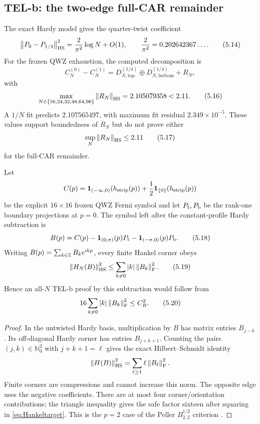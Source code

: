 \subsection{TEL-b: the two-edge full-CAR remainder}

The exact Hardy model gives the quarter-twist coefficient
\[
 \left\lVert P_0-P_{1/4}\right\rVert_{\mathrm{HS}}^2
 =\frac{2}{\pi^2}\log N+O(1),
\qquad \frac2{\pi^2}=0.202642367\ldots .
\tag{5.14}\label{eq:hardylog}
\]
For the frozen QWZ exhaustion, the computed decomposition is
\[
 C_N^{(0)}-C_N^{(1)}
 =D_{N,\mathrm{top}}^{(1/4)}
  \oplus D_{N,\mathrm{bottom}}^{(1/4)}+R_N,
\tag{5.15}\label{eq:tworemainder}
\]
with
\[
 \max_{N\in\{16,24,32,48,64,96\}}\left\lVert R_N\right\rVert_{\mathrm{HS}}
 =2.105079358<2.11.
\tag{5.16}\label{eq:measured211}
\]
A $1/N$ fit predicts $2.107565497$, with maximum fit residual
$2.349\times10^{-5}$.  These values support boundedness of $R_N$ but do
not prove either
\[
 \sup_N\left\lVert R_N\right\rVert_{\mathrm{HS}}\le2.11
\tag{5.17}\label{eq:allN211}
\]
for the full-CAR remainder.

\begin{proposition}
\label{prop:HankelReduction}
Let
\[
 C(p)=\mathbf 1_{(-\infty,0)}(h_{\rm strip}(p))
       +\frac12\mathbf 1_{\{0\}}(h_{\rm strip}(p))
\]
be the explicit $16\times16$ frozen QWZ Fermi symbol and let
$P_{\rm t},P_{\rm b}$ be the rank-one boundary projections at $p=0$.
The symbol left after the constant-profile Hardy subtraction is
\[
 B(p)=C(p)
 -\mathbf 1_{(0,\pi)}(p)P_{\rm t}
 -\mathbf 1_{(-\pi,0)}(p)P_{\rm b}.
\tag{5.18}\label{eq:regularizedsymbol}
\]
Writing $B(p)=\sum_{k\in\mathbb Z}B_ke^{ikp}$, every finite Hankel corner
obeys
\[
 \left\lVert H_N(B)\right\rVert_{\mathrm{HS}}^2
 \le\sum_{k\ne0}|k|\left\lVert B_k\right\rVert_{\mathrm F}^2.
\tag{5.19}\label{eq:PellerHS}
\]
Hence an all-$N$ TEL-b proof by this subtraction would follow from
\[
 16\sum_{k\ne0}|k|\left\lVert B_k\right\rVert_{\mathrm F}^2\le C_R^2.
\tag{5.20}\label{eq:Hankeltarget}
\]
\end{proposition}

\begin{proof}
In the untwisted Hardy basis, multiplication by $B$ has matrix entries
$B_{j-k}$.  Its off-diagonal Hardy corner has entries $B_{j+k+1}$.
Counting the pairs $(j,k)\in\mathbb N_0^2$ with $j+k+1=\ell$ gives the exact
Hilbert--Schmidt identity
\[
 \left\lVert H(B)\right\rVert_{\mathrm{HS}}^2
 =\sum_{\ell\ge1}\ell\left\lVert B_\ell\right\rVert_{\mathrm F}^2.
\]
Finite corners are compressions and cannot increase this norm.  The
opposite edge uses the negative coefficients.  There are at most four
corner/orientation contributions; the triangle inequality gives the
safe factor sixteen after squaring in \eqref{eq:Hankeltarget}.  This is
the $p=2$ case of the Peller $B^{1/2}_{2,2}$ criterion \cite{Peller}.
\end{proof}


